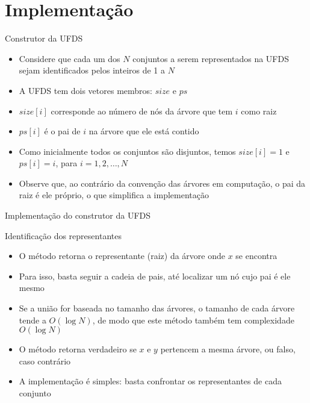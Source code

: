 \section{Implementação}

\begin{frame}[fragile]{Construtor da UFDS}

    \begin{itemize}
        \item Considere que cada um dos $N$ conjuntos a serem representados na UFDS sejam
            identificados pelos inteiros de 1 a $N$

        \item A UFDS tem dois vetores membros: $size$ e $ps$

        \item $size[i]$ corresponde ao número de nós da árvore que tem $i$ como raiz

        \item $ps[i]$ é o pai de $i$ na árvore que ele está contido

        \item Como inicialmente todos os conjuntos são disjuntos, temos $size[i] = 1$
            e $ps[i] = i$, para $i = 1, 2, \ldots, N$

        \item Observe que, ao contrário da convenção das árvores em computação, o pai da raiz
            é ele próprio, o que simplifica a implementação

    \end{itemize}

\end{frame}

\begin{frame}[fragile]{Implementação do construtor da UFDS}
\end{frame}

\begin{frame}[fragile]{Identificação dos representantes}

    \begin{itemize}
        \item O método  retorna o representante (raiz) da árvore onde 
            $x$ se encontra

        \item Para isso, basta seguir a cadeia de pais, até localizar um nó cujo pai é ele
            mesmo

        \item Se a união for baseada no tamanho das árvores, o tamanho de cada árvore tende a
            $O(\log N)$, de modo que este método também tem complexidade $O(\log N)$

        \item O método  retorna verdadeiro se $x$ e $y$ pertencem a 
            mesma árvore, ou falso, caso contrário

        \item A implementação é simples: basta confrontar os representantes de cada conjunto
    \end{itemize}

\end{frame}

